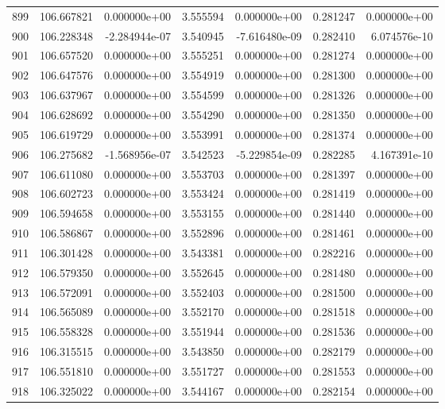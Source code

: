 \begin{tabular}{rrrrrrr}
 899 & 106.667821 &  0.000000e+00 &  3.555594 &  0.000000e+00 &    0.281247 &  0.000000e+00 \\
 900 & 106.228348 & -2.284944e-07 &  3.540945 & -7.616480e-09 &    0.282410 &  6.074576e-10 \\
 901 & 106.657520 &  0.000000e+00 &  3.555251 &  0.000000e+00 &    0.281274 &  0.000000e+00 \\
 902 & 106.647576 &  0.000000e+00 &  3.554919 &  0.000000e+00 &    0.281300 &  0.000000e+00 \\
 903 & 106.637967 &  0.000000e+00 &  3.554599 &  0.000000e+00 &    0.281326 &  0.000000e+00 \\
 904 & 106.628692 &  0.000000e+00 &  3.554290 &  0.000000e+00 &    0.281350 &  0.000000e+00 \\
 905 & 106.619729 &  0.000000e+00 &  3.553991 &  0.000000e+00 &    0.281374 &  0.000000e+00 \\
 906 & 106.275682 & -1.568956e-07 &  3.542523 & -5.229854e-09 &    0.282285 &  4.167391e-10 \\
 907 & 106.611080 &  0.000000e+00 &  3.553703 &  0.000000e+00 &    0.281397 &  0.000000e+00 \\
 908 & 106.602723 &  0.000000e+00 &  3.553424 &  0.000000e+00 &    0.281419 &  0.000000e+00 \\
 909 & 106.594658 &  0.000000e+00 &  3.553155 &  0.000000e+00 &    0.281440 &  0.000000e+00 \\
 910 & 106.586867 &  0.000000e+00 &  3.552896 &  0.000000e+00 &    0.281461 &  0.000000e+00 \\
 911 & 106.301428 &  0.000000e+00 &  3.543381 &  0.000000e+00 &    0.282216 &  0.000000e+00 \\
 912 & 106.579350 &  0.000000e+00 &  3.552645 &  0.000000e+00 &    0.281480 &  0.000000e+00 \\
 913 & 106.572091 &  0.000000e+00 &  3.552403 &  0.000000e+00 &    0.281500 &  0.000000e+00 \\
 914 & 106.565089 &  0.000000e+00 &  3.552170 &  0.000000e+00 &    0.281518 &  0.000000e+00 \\
 915 & 106.558328 &  0.000000e+00 &  3.551944 &  0.000000e+00 &    0.281536 &  0.000000e+00 \\
 916 & 106.315515 &  0.000000e+00 &  3.543850 &  0.000000e+00 &    0.282179 &  0.000000e+00 \\
 917 & 106.551810 &  0.000000e+00 &  3.551727 &  0.000000e+00 &    0.281553 &  0.000000e+00 \\
 918 & 106.325022 &  0.000000e+00 &  3.544167 &  0.000000e+00 &    0.282154 &  0.000000e+00 \\

\end{tabular}
